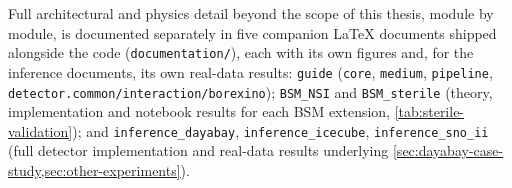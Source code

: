 Full architectural and physics detail beyond the scope of this thesis, module by module, is documented separately in five companion \LaTeX{} documents shipped alongside the code (\texttt{documentation/}), each with its own figures and, for the inference documents, its own real-data results: \texttt{guide} (\texttt{core}, \texttt{medium}, \texttt{pipeline}, \texttt{detector.common/interaction/borexino}); \texttt{BSM\_NSI} and \texttt{BSM\_sterile} (theory, implementation and notebook results for each BSM extension, \cref{tab:sterile-validation}); and \texttt{inference\_dayabay}, \texttt{inference\_icecube}, \texttt{inference\_sno\_ii} (full detector implementation and real-data results underlying \cref{sec:dayabay-case-study,sec:other-experiments}).
